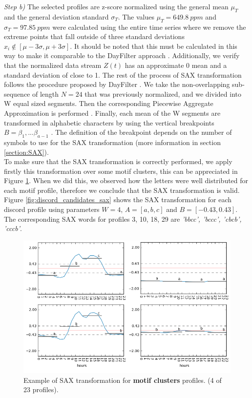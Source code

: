 \textit{Step b)} The selected profiles are z-score normalized using the general mean $\mu_T$ and the general deviation standard $\sigma_T$. The values $\mu_T = 649.8 \ ppm$ and  $\sigma_T = 97.85 \ ppm$ were calculated using the entire time series where we remove the extreme points that fall outside of three standard deviations $x_i \not \in [\mu - 3\sigma, \mu + 3\sigma ]$. It should be noted that this must be calculated in this way to make it comparable to the DayFilter approach \cite{miller2015automated}. Additionally, we verify that the normalized data stream $Z(t)$ has an approximate 0 mean and a standard deviation of close to 1. The rest of the process of SAX transformation follows the procedure proposed by DayFilter \cite{lin2003symbolic, keogh2005hot, lin2007experiencing, miller2015automated}. We take the non-overlapping sub-sequence of length $N=24$ that was previously normalized, and we divided into W equal sized segments. Then the corresponding Piecewise Aggregate Approximation is performed \cite{lin2007experiencing}. Finally, each mean of the W segments are transformed in alphabetic characters by using the vertical breakpoints $B = \beta_1, ... \beta_{a-1}$ \cite{lin2007experiencing}. The definition of the breakpoint depends on the number of symbols to use for the SAX transformation (more information in section \ref{section:SAX}). \\

To make sure that the SAX transformation is correctly performed, we apply firstly this transformation over some motif clusters, this can be appreciated in Figure \ref{fig:motif_candidates_sax}. When we did this, we observed how the
letters were well distributed for each motif profile, therefore we conclude that the SAX transformation
is valid. Figure \ref{fig:discord_candidates_sax} shows the SAX transformation for each discord profile using parameters $W=4$,  $A=[a,b,c]$ and $B=[-0.43, 0.43]$. The corresponding SAX words for profiles 3, 10, 18, 29 are \textit{'bbcc', 'bccc', 'cbcb', 'cccb'}. \\

\begin{figure}[h!]
  \vspace{0.5em} %
  \includegraphics[scale=0.65]{Figures/motif_candidates_sax.jpg}
  \caption{Example of SAX transformation for \textbf{motif clusters} profiles. (4 of 23 profiles).}
  \label{fig:motif_candidates_sax}
\end{figure}

